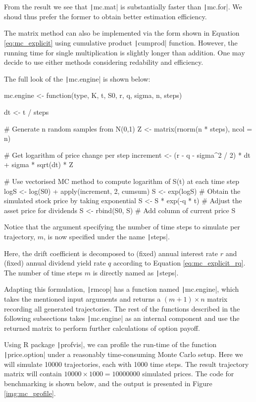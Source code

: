 From the result we see that \texttt|mc.mat| is substantially faster than \texttt|mc.for|. We shoud thus prefer the former to obtain better estimation efficiency.

The matrix method can also be implemented via the form shown in Equation \ref{eq:mc_explicit} using cumulative product \texttt|cumprod| function. However, the running time for single multiplication is slightly longer than addition. One may decide to use either methods considering redability and efficiency.

The full look of the \texttt|mc.engine| is shown below:

\begin{Rminted}
mc.engine <- function(type, K, t, S0, r, q, sigma, n, steps) {

    dt <- t / steps

    # Generate n random samples from N(0,1)
    Z <- matrix(rnorm(n * steps), ncol = n)

    # Get logarithm of price change per step
    increment <- (r - q - sigma^2 / 2) * dt + sigma * sqrt(dt) * Z

    # Use vectorised MC method to compute logarithm of S(t) at each time step
    logS <- log(S0) + apply(increment, 2, cumsum)
    S <- exp(logS) # Obtain the simulated stock price by taking exponential
    S <- S * exp(-q * t) # Adjust the asset price for dividends
    S <- rbind(S0, S) # Add column of current price
    S
}
\end{Rminted}

Notice that the argument specifying the number of time steps to simulate per trajectory, $m$, is now specified under the name \texttt|steps|.

Here, the drift coefficient is decomposed to (fixed) annual interest rate $r$ and (fixed) annual dividend yield rate $q$ according to Equation \ref{eq:mc_explicit_rq}. The number of time steps $m$ is directly named as \texttt|steps|.

Adapting this formulation, \texttt|rmcop| has a function named \texttt|mc.engine|, which takes the mentioned input arguments and returns a $(m+1)\times n$ matrix recording all generated trajectories. The rest of the functions described in the following subsections takes \texttt|mc.engine| as an internal component and use the returned matrix to perform further calculations of option payoff.

Using R package \texttt|profvis|, we can profile the run-time of the function \texttt|price.option| under a reasonably time-consuming Monte Carlo setup. Here we will simulate 10000 trajectories, each with 1000 time steps. The result trajectory matrix will contain $10000\times1000=10000000$ simulated prices. The code for benchmarking is shown below, and the output is presented in Figure \ref{img:mc_profile}.

